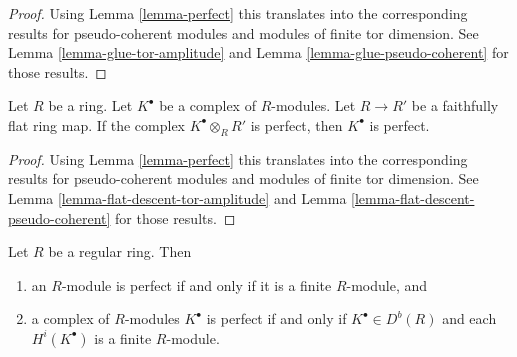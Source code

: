 \begin{proof}
Using
Lemma \ref{lemma-perfect}
this translates into the corresponding results for pseudo-coherent modules
and modules of finite tor dimension. See
Lemma \ref{lemma-glue-tor-amplitude}
and
Lemma \ref{lemma-glue-pseudo-coherent}
for those results.
\end{proof}

\begin{lemma}
\label{lemma-flat-descent-perfect}
Let $R$ be a ring. Let $K^\bullet$ be a complex of $R$-modules.
Let $R \to R'$ be a faithfully flat ring map. If the complex
$K^\bullet \otimes_R R'$ is perfect, then $K^\bullet$ is perfect.
\end{lemma}

\begin{proof}
Using
Lemma \ref{lemma-perfect}
this translates into the corresponding results for pseudo-coherent modules
and modules of finite tor dimension. See
Lemma \ref{lemma-flat-descent-tor-amplitude}
and
Lemma \ref{lemma-flat-descent-pseudo-coherent}
for those results.
\end{proof}

\begin{lemma}
\label{lemma-regular-perfect}
Let $R$ be a regular ring. Then
\begin{enumerate}
\item an $R$-module is perfect if and only if it is a finite $R$-module, and
\item a complex of $R$-modules $K^\bullet$ is perfect if and only
if $K^\bullet \in D^b(R)$ and each $H^i(K^\bullet)$ is a finite $R$-module.
\end{enumerate}
\end{lemma}


